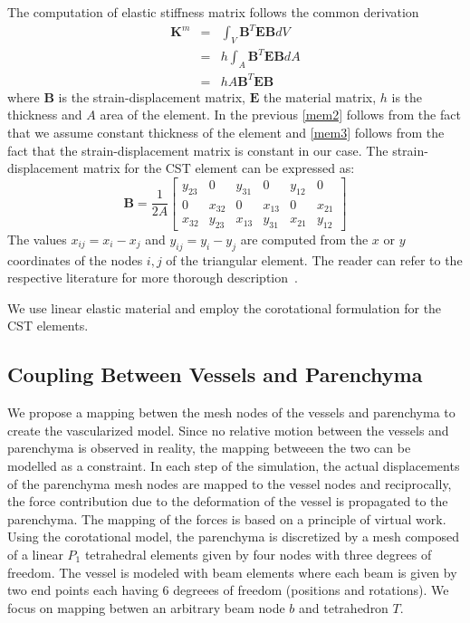 \documentclass[final,3p,times,twocolumn]{elsarticle}
\newcommand{\Mat}[1]{\boldsymbol{#1}}
\begin{document}
The computation of elastic stiffness matrix follows the common derivation
%
\begin{eqnarray}
  \Mat{K}^m & = & \int_V \Mat{B}^T \Mat{E} \Mat{B} dV     \label{mem1} \\
            & = & h \int_A \Mat{B}^T \Mat{E} \Mat{B} dA   \label{mem2} \\
            & = & h A \Mat{B}^T \Mat{E} \Mat{B}           \label{mem3}
\end{eqnarray}
%
where $\Mat{B}$ is the strain-displacement matrix, $\Mat{E}$ the material
matrix, $h$ is the thickness and $A$ area of the element. In the previous
\eqref{mem2} follows from the fact that we assume constant thickness of the
element and \eqref{mem3} follows from the fact that the strain-displacement
matrix is constant in our case. The strain-displacement matrix for the CST
element can be expressed as:
%
\begin{equation}
  \Mat{B} = \frac{1}{2A} \begin{bmatrix}
    y_{23} & 0      & y_{31} & 0      & y_{12} & 0 \\
         0 & x_{32} & 0      & x_{13} & 0      & x_{21} \\
    x_{32} & y_{23} & x_{13} & y_{31} & x_{21} & y_{12}
  \end{bmatrix}
\end{equation}
%
The values $x_{ij} = x_i - x_j$ and $y_{ij} = y_i - y_j$ are computed from
the $x$ or $y$ coordinates of the nodes $i,j$ of the triangular element.
The reader can refer to the respective literature for more thorough
description~\cite{Felippa2003}.

We use linear elastic material and employ the corotational formulation
for the CST elements.



\subsection{Coupling Between Vessels and Parenchyma} %

We propose a mapping betwen the mesh nodes of the vessels and parenchyma to
create the vascularized model. Since no relative motion between the vessels
and parenchyma is observed in reality, the mapping betweeen the two can be
modelled as a constraint. In each step of the simulation, the actual
displacements of the parenchyma mesh nodes are mapped to the vessel nodes
and reciprocally, the force contribution due to the deformation of the
vessel is propagated to the parenchyma. The mapping of the forces is based
on a principle of virtual work. Using the corotational model, the
parenchyma is discretized by a mesh composed of a linear $P_1$ tetrahedral
elements given by four nodes with three degrees of freedom. The vessel is
modeled with beam elements where each beam is given by two end points each
having 6 degreees of freedom (positions and rotations). We focus on mapping
betwen an arbitrary beam node $b$ and tetrahedron $T$.
\end{document}
